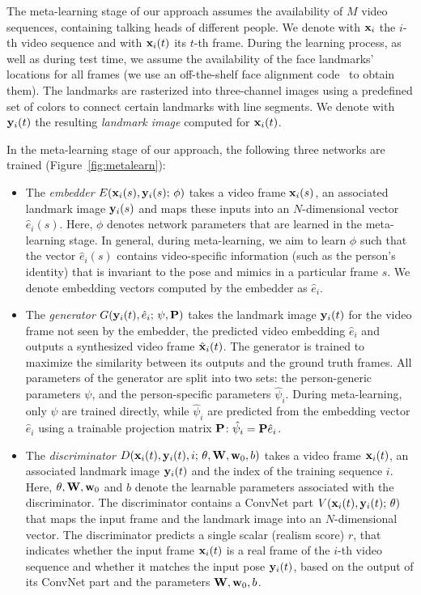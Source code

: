 \documentclass[10pt,twocolumn,letterpaper]{article}
\newcommand{\fig}[1]{Figure~\ref{fig:#1}}
\newcommand{\e}{e}
\begin{document}
The meta-learning stage of our approach assumes the availability of $M$ video sequences, containing talking heads of different people. We denote with $\x_i$ the $i$-th video sequence and with $\x_i(t)$ its $t$-th frame. During the learning process, as well as during test time, we assume the availability of the face landmarks' locations for all frames (we use an off-the-shelf face alignment code~\cite{Bulat17} to obtain them). The landmarks are rasterized into three-channel images using a predefined set of colors to connect certain landmarks with line segments. We denote with $\y_i(t)$ the resulting \textit{landmark image} computed for $\x_i(t)$.

In the meta-learning stage of our approach, the following three networks are trained (\fig{metalearn}):
\begin{itemize}[noitemsep,nolistsep,leftmargin=*]
    \item The \textit{embedder}  $E(\x_i(s),\y_i(s);\,\phi)$ takes a video frame $\x_i(s)$, an associated landmark image $\y_i(s)$ and maps these inputs into an $N$-dimensional vector $\hat{\e}_i(s)$. Here, $\phi$ denotes network parameters that are learned in the meta-learning stage. In general, during meta-learning, we aim to learn $\phi$ such that the vector $\hat{\e}_i(s)$ contains video-specific information (such as the person's identity) that is invariant to the pose and mimics in a particular frame $s$. We denote embedding vectors computed by the embedder as $\hat{\e}_i$.
    
    \item The \textit{generator}  $G(\y_i(t), \hat{\e}_i;\,\psi, \P)$ takes the landmark image $\y_i(t)$ for the video frame not seen by the embedder, the predicted video embedding $\hat{\e}_i$ and outputs a synthesized video frame $\hat{\x}_i(t)$. The generator is trained to maximize the similarity between its outputs and the ground truth frames. All parameters of the generator are split into two sets: the person-generic parameters $\psi$, and the person-specific parameters $\hat\psi_i$. During meta-learning, only $\psi$ are trained directly, while $\hat\psi_i$ are predicted from the embedding vector $\hat\e_i$ using a trainable projection matrix $\P$: $\hat\psi_i=\P\hat\e_i$.
    
    \item The \textit{discriminator} $D(\x_i(t),\y_i(t),i;\,\theta,\W,\w_0,b)$ takes a video frame $\x_i(t)$, an associated landmark image $\y_i(t)$ and the index of the training sequence $i$. Here, $\theta,\W,\w_0$ and $b$ denote the learnable parameters associated with the discriminator.  The discriminator contains a ConvNet part $V(\x_i(t),\y_i(t);\,\theta)$ that maps the input frame and the landmark image into an $N$-dimensional vector. The discriminator predicts a single scalar (realism score) $r$, that indicates whether the input frame $\x_i(t)$ is a real frame of the $i$-th video sequence and whether it matches the input pose $\y_i(t)$, based on the output of its ConvNet part and the parameters $\W,\w_0,b$.
\end{itemize}
\end{document}
